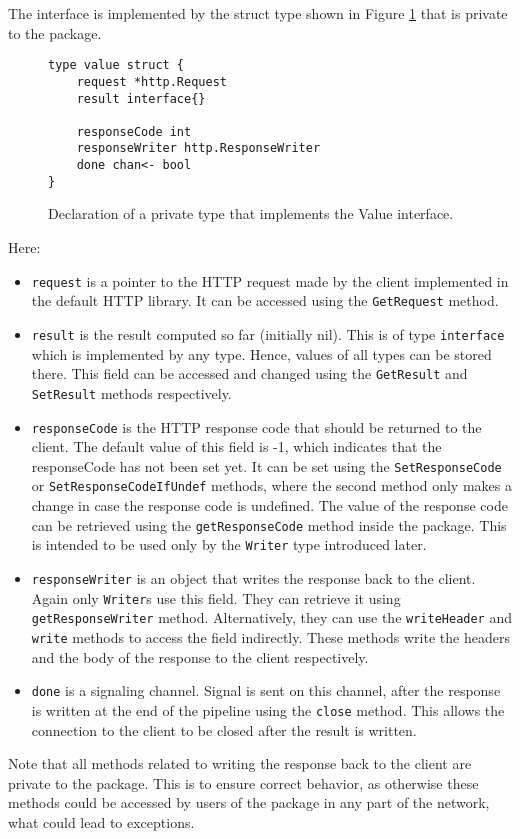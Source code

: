 \documentclass[12pt,a4paper]{article}
\begin{document}
The interface is implemented by the struct type shown in Figure \ref{fig:value}
that is private to the package.
\newpage
\begin{figure}[h]
\centering
\begin{lstlisting}
type value struct {
    request *http.Request
    result interface{}

    responseCode int
    responseWriter http.ResponseWriter
    done chan<- bool
}
\end{lstlisting}
\caption[scale=1.0]{Declaration of a private type that implements the Value 
interface.}
\label{fig:value}
\end{figure}
Here:
\begin{itemize}
  \item \texttt{request} is a pointer to the HTTP request made by the 
        client implemented in the default HTTP library. It can be accessed
        using the \texttt{GetRequest} method. 

  \item \texttt{result} is the result computed so far (initially nil). This is
        of type \texttt{interface{}} which is implemented by any type.
        Hence, values of all types can be stored there. This field can be
        accessed and changed using the \texttt{GetResult} and \texttt{SetResult}
        methods respectively.
  
  \item \texttt{responseCode} is the HTTP response code that should be 
        returned to the client. The default value of this field is -1,
        which indicates that the responseCode has not been set yet. 
        It can be set using the \texttt{SetResponseCode} or 
        \texttt{SetResponseCodeIfUndef} methods, where the second method only
        makes a change in case the response code is undefined. The value
        of the response code can be retrieved using the \texttt{getResponseCode}
        method inside the package. This is intended to be used only by the 
        \texttt{Writer} type introduced later.

  \item \texttt{responseWriter} is an object that writes the response back 
        to the client. Again only \texttt{Writer}s use this field. They
        can retrieve it using \texttt{getResponseWriter} method. 
        Alternatively, they can use the \texttt{writeHeader} and
        \texttt{write} methods to access the field indirectly.
        These methods write the headers and 
        the body of the response to the client respectively.

  \item \texttt{done} is a signaling channel. Signal is sent on this channel,
		after the response is written at the end of the pipeline using the 
        \texttt{close} method. This allows the connection to the client to 
        be closed after the result is written.
\end{itemize}
Note that all methods related to writing the response back to the client
are private to the package. This is to ensure correct behavior, as otherwise
these methods could be accessed by users of the package in any part of the 
network, what could lead to exceptions.
\end{document}
